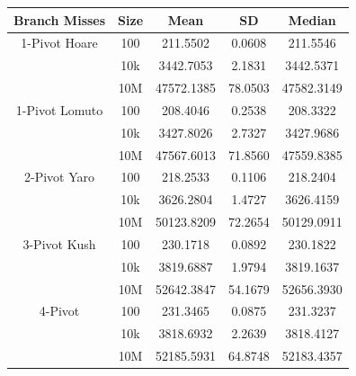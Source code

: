 \documentclass{article}
\begin{document}
\begin{center}
    \begin{tabular}{ |c c | c c c| }
        \hline
        Branch Misses   & Size     & Mean         & SD        & Median \\
        \hline
        1-Pivot Hoare   & 100      & 211.5502     & 0.0608    & 211.5546 \\
                        & 10k      & 3442.7053    & 2.1831    & 3442.5371 \\
                        & 10M      & 47572.1385   & 78.0503   & 47582.3149 \\
        \hline
        1-Pivot Lomuto  & 100      & 208.4046     & 0.2538    & 208.3322 \\
                        & 10k      & 3427.8026    & 2.7327    & 3427.9686 \\
                        & 10M      & 47567.6013   & 71.8560   & 47559.8385 \\
        \hline
        2-Pivot Yaro    & 100      & 218.2533     & 0.1106    & 218.2404 \\
                        & 10k      & 3626.2804    & 1.4727    & 3626.4159 \\
                        & 10M      & 50123.8209   & 72.2654   & 50129.0911 \\
        \hline
        3-Pivot Kush    & 100      & 230.1718     & 0.0892    & 230.1822 \\
                        & 10k      & 3819.6887    & 1.9794    & 3819.1637 \\
                        & 10M      & 52642.3847   & 54.1679   & 52656.3930 \\
        \hline
        4-Pivot         & 100      & 231.3465     & 0.0875    & 231.3237 \\
                        & 10k      & 3818.6932    & 2.2639    & 3818.4127 \\
                        & 10M      & 52185.5931   & 64.8748   & 52183.4357 \\
        \hline
    \end{tabular}
\end{center}
\end{document}
